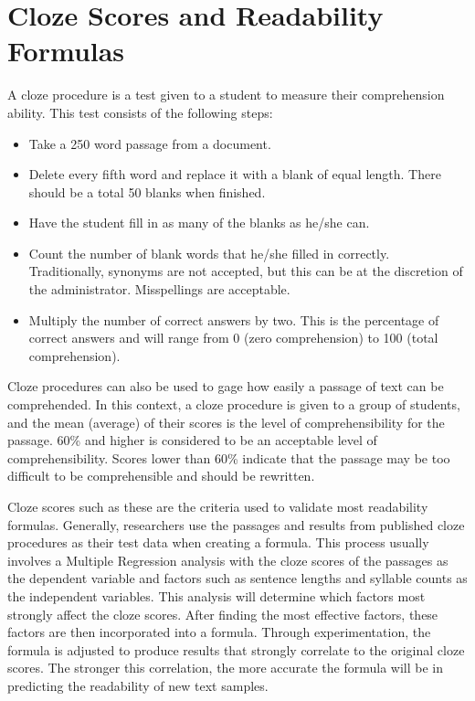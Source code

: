 \documentclass[
]{book}
\providecommand{\tightlist}{%
  \setlength{\itemsep}{0pt}\setlength{\parskip}{0pt}}
\theoremstyle{definition}
\theoremstyle{definition}
\theoremstyle{definition}
\theoremstyle{definition}
\theoremstyle{remark}
\begin{document}
\hypertarget{cloze}{%
\section{Cloze Scores and Readability Formulas}\label{cloze}}

\begin{minipage}{\textwidth}

A cloze procedure is a test given to a student to measure their comprehension ability. This test consists of the following steps:

\begin{itemize}
\tightlist
\item
  Take a 250 word passage from a document.
\item
  Delete every fifth word and replace it with a blank of equal length. There should be a total 50 blanks when finished.
\item
  Have the student fill in as many of the blanks as he/she can.
\item
  Count the number of blank words that he/she filled in correctly. Traditionally, synonyms are not accepted, but this can be at the discretion of the administrator. Misspellings are acceptable.
\item
  Multiply the number of correct answers by two. This is the percentage of correct answers and will range from 0 (zero comprehension) to 100 (total comprehension).
\end{itemize}

\end{minipage}

Cloze procedures can also be used to gage how easily a passage of text can be comprehended. In this context, a cloze procedure is given to a group of students, and the mean (average) of their scores is the level of comprehensibility for the passage. 60\% and higher is considered to be an acceptable level of comprehensibility. Scores lower than 60\% indicate that the passage may be too difficult to be comprehensible and should be rewritten.

Cloze scores such as these are the criteria used to validate most readability formulas. Generally, researchers use the passages and results from published cloze procedures as their test data when creating a formula. This process usually involves a Multiple Regression analysis with the cloze scores of the passages as the dependent variable and factors such as sentence lengths and syllable counts as the independent variables. This analysis will determine which factors most strongly affect the cloze scores. After finding the most effective factors, these factors are then incorporated into a formula. Through experimentation, the formula is adjusted to produce results that strongly correlate to the original cloze scores. The stronger this correlation, the more accurate the formula will be in predicting the readability of new text samples.
\end{document}
